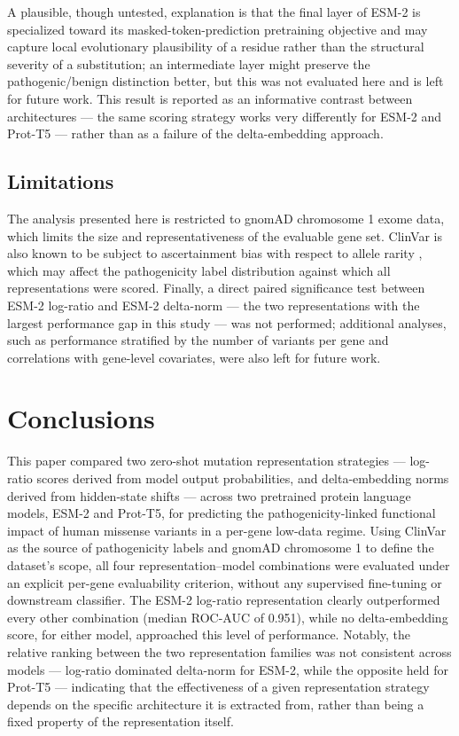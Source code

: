 \documentclass[12pt]{article}
\begin{document}
A plausible, though untested, explanation is that the final layer of ESM-2 is specialized toward its masked-token-prediction pretraining objective and may capture local evolutionary plausibility of a residue rather than the structural severity of a substitution; an intermediate layer might preserve the pathogenic/benign distinction better, but this was not evaluated here and is left for future work. This result is reported as an informative contrast between architectures --- the same scoring strategy works very differently for ESM-2 and Prot-T5 --- rather than as a failure of the delta-embedding approach.

\subsection{Limitations}
\label{sec:limitations}

The analysis presented here is restricted to gnomAD chromosome 1 exome data, which limits the size and representativeness of the evaluable gene set. ClinVar is also known to be subject to ascertainment bias with respect to allele rarity \cite{mikhail}, which may affect the pathogenicity label distribution against which all representations were scored. Finally, a direct paired significance test between ESM-2 log-ratio and ESM-2 delta-norm --- the two representations with the largest performance gap in this study --- was not performed; additional analyses, such as performance stratified by the number of variants per gene and correlations with gene-level covariates, were also left for future work.

\section{Conclusions}

This paper compared two zero-shot mutation representation strategies --- log-ratio scores derived from model output probabilities, and delta-embedding norms derived from hidden-state shifts --- across two pretrained protein language models, ESM-2 and Prot-T5, for predicting the pathogenicity-linked functional impact of human missense variants in a per-gene low-data regime. Using ClinVar as the source of pathogenicity labels and gnomAD chromosome 1 to define the dataset's scope, all four representation--model combinations were evaluated under an explicit per-gene evaluability criterion, without any supervised fine-tuning or downstream classifier. The ESM-2 log-ratio representation clearly outperformed every other combination (median ROC-AUC of 0.951), while no delta-embedding score, for either model, approached this level of performance. Notably, the relative ranking between the two representation families was not consistent across models --- log-ratio dominated delta-norm for ESM-2, while the opposite held for Prot-T5 --- indicating that the effectiveness of a given representation strategy depends on the specific architecture it is extracted from, rather than being a fixed property of the representation itself.
\end{document}
